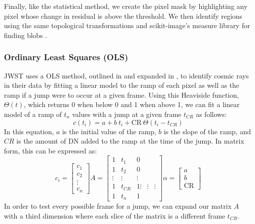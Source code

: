 Finally, like the statistical method, we create the pixel mask by highlighting any pixel whose change in residual is above the threshold.
We then identify regions using the same topological transformations and scikit-image's measure library for finding blobs \parencite{scikit-image}.

\subsubsection{Ordinary Least Squares (OLS)}
JWST uses a OLS method, outlined in \cite{robberto2014generalized} and expanded in \cite{robberto2015cr}, to identify cosmic rays in their data by fitting a linear model to the ramp of each pixel as well as the ramp if a jump were to occur at a given frame.
Using this Heaviside function, $\Theta(t)$, which returns 0 when below 0 and 1 when above 1, we can fit a linear model of a ramp of $t_n$ values with a jump at a given frame $t_{CR}$ as follows:
\begin{equation}
    c(t_i) = a + b\ t_i + \text{CR}\ \Theta(t_i - t_{CR})
\end{equation}
In this equation, $a$ is the initial value of the ramp, $b$ is the slope of the ramp, and $CR$ is the amount of DN added to the ramp at the time of the jump.
In matrix form, this can be expressed as:
\begin{equation}
    c_i = \begin{bmatrix}
        c_1 \\
        c_2 \\
        \vdots \\
        c_n
    \end{bmatrix}
    A = \begin{bmatrix}
        1 & t_1 & 0 \\
        1 & t_2 & 0 \\
        \vdots & \vdots & \vdots \\
        1 & t_{CR} & 1
        \vdots & \vdots & \vdots \\
        1 & t_n & 1
    \end{bmatrix}
    \alpha = \begin{bmatrix}
        a \\ b \\ \text{CR}
    \end{bmatrix}
\end{equation}
In order to test every possible frame for a jump, we can expand our matrix $A$ with a third dimension where each slice of the matrix is a different frame $t_{CR}$.
